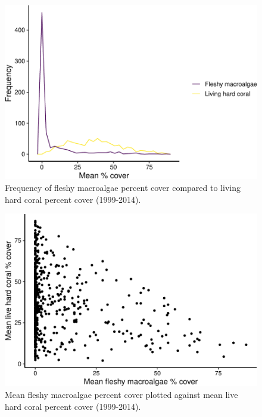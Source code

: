 \documentclass[12pt,]{article}
\begin{document}
\begin{figure}

{\centering \includegraphics{Mullaney_ENV872_Project_files/figure-latex/Coral Algae Exploratory Plot-1} 

}

\caption{Frequency of fleshy macroalgae percent cover compared to living hard coral percent cover (1999-2014).}\label{fig:Coral Algae Exploratory Plot}
\end{figure}

\begin{figure}

{\centering \includegraphics{Mullaney_ENV872_Project_files/figure-latex/Coral Algae Scatter-1} 

}

\caption{Mean fleshy macroalgae percent cover plotted against mean live hard coral percent cover (1999-2014).}\label{fig:Coral Algae Scatter}
\end{figure}
\end{document}
